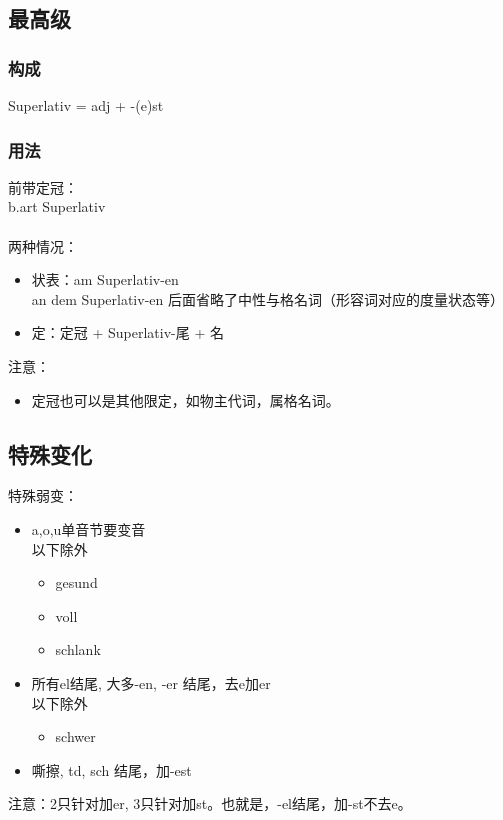 \subsection{最高级}
\subsubsection{构成}
\begin{center}
    \begin{myquote}
        Superlativ = adj + -(e)st \\
    \end{myquote}
\end{center}

\subsubsection{用法}
前带定冠：\\
b.art Superlativ \\
\\
两种情况：
\begin{itemize}
    \item 状表：am Superlativ-en \\
          an dem Superlativ-en 后面省略了中性与格名词（形容词对应的度量状态等）
    \item 定：定冠 + Superlativ-尾 + 名
\end{itemize}
注意：
\begin{itemize}
    \item 定冠也可以是其他限定，如物主代词，属格名词。
\end{itemize}

\subsection{特殊变化}

特殊弱变：
\begin{itemize}
    \item a,o,u单音节要变音 \\
          以下除外
          \begin{itemize}
              \item gesund
              \item voll
              \item schlank
          \end{itemize}
    \item 所有el结尾, 大多-en, -er 结尾，去e加er \\
          以下除外
          \begin{itemize}
              \item schwer 
          \end{itemize}
    \item 嘶擦, td, sch 结尾，加-est
\end{itemize}
注意：2只针对加er, 3只针对加st。也就是，-el结尾，加-st不去e。

